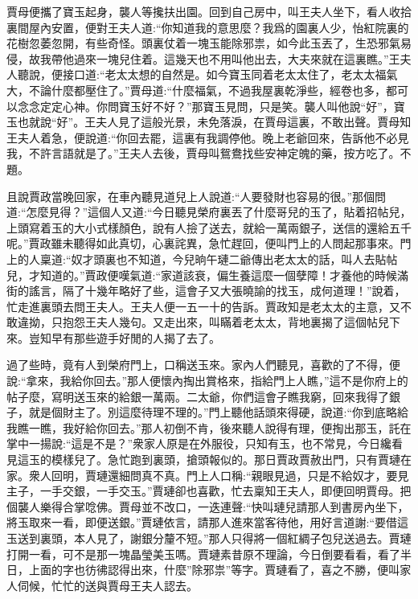 \begin{parag}
    賈母便攜了寶玉起身，襲人等攙扶出園。回到自己房中，叫王夫人坐下，看人收拾裏間屋內安置，便對王夫人道:“你知道我的意思麼？我爲的園裏人少，怡紅院裏的花樹忽萎忽開，有些奇怪。頭裏仗着一塊玉能除邪祟，如今此玉丟了，生恐邪氣易侵，故我帶他過來一塊兒住着。這幾天也不用叫他出去，大夫來就在這裏瞧。”王夫人聽說，便接口道:“老太太想的自然是。如今寶玉同着老太太住了，老太太福氣大，不論什麼都壓住了。”賈母道:“什麼福氣，不過我屋裏乾淨些，經卷也多，都可以念念定定心神。你問寶玉好不好？”那寶玉見問，只是笑。襲人叫他說“好”，寶玉也就說“好”。王夫人見了這般光景，未免落淚，在賈母這裏，不敢出聲。賈母知王夫人着急，便說道:“你回去罷，這裏有我調停他。晚上老爺回來，告訴他不必見我，不許言語就是了。”王夫人去後，賈母叫鴛鴦找些安神定魄的藥，按方吃了。不題。
\end{parag}


\begin{parag}
    且說賈政當晚回家，在車內聽見道兒上人說道:“人要發財也容易的很。”那個問道:“怎麼見得？”這個人又道:“今日聽見榮府裏丟了什麼哥兒的玉了，貼着招帖兒，上頭寫着玉的大小式樣顏色，說有人撿了送去，就給一萬兩銀子，送信的還給五千呢。”賈政雖未聽得如此真切，心裏詫異，急忙趕回，便叫門上的人問起那事來。門上的人稟道:“奴才頭裏也不知道，今兒晌午璉二爺傳出老太太的話，叫人去貼帖兒，才知道的。”賈政便嘆氣道:“家道該衰，偏生養這麼一個孽障！才養他的時候滿街的謠言，隔了十幾年略好了些，這會子又大張曉諭的找玉，成何道理！”說着，忙走進裏頭去問王夫人。王夫人便一五一十的告訴。賈政知是老太太的主意，又不敢違拗，只抱怨王夫人幾句。又走出來，叫瞞着老太太，背地裏揭了這個帖兒下來。豈知早有那些遊手好閒的人揭了去了。
\end{parag}


\begin{parag}
    過了些時，竟有人到榮府門上，口稱送玉來。家內人們聽見，喜歡的了不得，便說:“拿來，我給你回去。”那人便懷內掏出賞格來，指給門上人瞧，”這不是你府上的帖子麼，寫明送玉來的給銀一萬兩。二太爺，你們這會子瞧我窮，回來我得了銀子，就是個財主了。別這麼待理不理的。”門上聽他話頭來得硬，說道:“你到底略給我瞧一瞧，我好給你回去。”那人初倒不肯，後來聽人說得有理，便掏出那玉，託在掌中一揚說:“這是不是？”衆家人原是在外服役，只知有玉，也不常見，今日纔看見這玉的模樣兒了。急忙跑到裏頭，搶頭報似的。那日賈政賈赦出門，只有賈璉在家。衆人回明，賈璉還細問真不真。門上人口稱:“親眼見過，只是不給奴才，要見主子，一手交銀，一手交玉。”賈璉卻也喜歡，忙去稟知王夫人，即便回明賈母。把個襲人樂得合掌唸佛。賈母並不改口，一迭連聲:“快叫璉兒請那人到書房內坐下，將玉取來一看，即便送銀。”賈璉依言，請那人進來當客待他，用好言道謝:“要借這玉送到裏頭，本人見了，謝銀分釐不短。”那人只得將一個紅綢子包兒送過去。賈璉打開一看，可不是那一塊晶瑩美玉嗎。賈璉素昔原不理論，今日倒要看看，看了半日，上面的字也彷彿認得出來，什麼”除邪祟”等字。賈璉看了，喜之不勝，便叫家人伺候，忙忙的送與賈母王夫人認去。
\end{parag}


